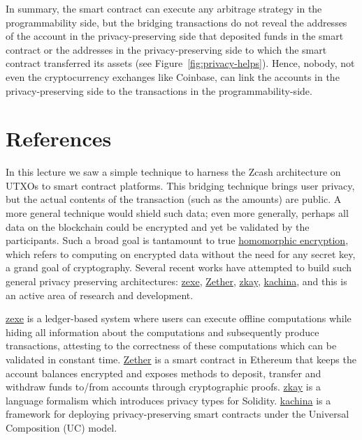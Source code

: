 \documentclass{article}
\begin{document}
In summary, the smart contract can execute any arbitrage strategy in the programmability side, but the bridging transactions do not reveal the addresses of the account in the privacy-preserving side that deposited funds in the smart contract or the addresses in the privacy-preserving side to which the smart contract transferred its assets (see Figure~\ref{fig:privacy-helps}). Hence, nobody, not even the cryptocurrency exchanges like Coinbase, can link the accounts in the privacy-preserving side to the transactions in the programmability-side.





\section*{References}

In this lecture we saw a simple technique to harness the Zcash architecture on UTXOs to  smart contract platforms. This bridging technique brings user privacy, but the actual contents of the transaction (such as the amounts) are public. A more general technique would shield such data; even more generally, perhaps all data on the blockchain could be encrypted and yet be validated by the  participants. Such a broad goal is tantamount to true \href{https://en.wikipedia.org/wiki/Homomorphic_encryption}{homomorphic encryption}, which refers to computing on encrypted data without the need for any secret key,  a grand goal of cryptography.  Several recent works have attempted to build such general privacy preserving architectures: \href{https://eprint.iacr.org/2018/962.pdf}{{\sf zexe}}, \href{https://eprint.iacr.org/2019/191}{{\sf Zether}}, \href{https://github.com/eth-sri/zkay}{{\sf zkay}}, 
\href{https://eprint.iacr.org/2020/543}{{\sf kachina}}, and this is an active area of research and development.

\href{https://eprint.iacr.org/2018/962.pdf}{{\sf zexe}}  is a ledger-based system where users can execute offline
computations while hiding all information about the computations and subsequently produce transactions, attesting to the correctness of these computations which can be validated in constant time.  \href{https://eprint.iacr.org/2019/191}{{\sf Zether}} is a smart contract in Ethereum that
keeps the account balances encrypted and exposes methods to deposit, transfer and withdraw
funds to/from accounts through cryptographic proofs.  \href{https://github.com/eth-sri/zkay}{{\sf zkay}} is a language formalism which introduces privacy types for Solidity. 
\href{https://eprint.iacr.org/2020/543}{{\sf kachina}} is a  framework for deploying privacy-preserving smart contracts under  the Universal Composition (UC) model.

 
\end{document}
